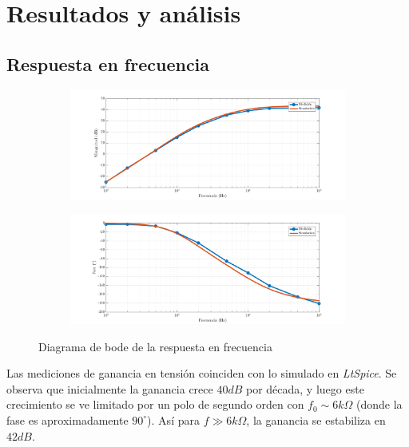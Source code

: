 \documentclass[../../e1_tp1_main.tex]{subfiles}
\begin{document}
\section{Resultados y an\'alisis}

\subsection{Respuesta en frecuencia}


\begin{figure} [H]
	\label{fig:2-hf}
	\centering
	\begin{subfigure}[c]{\textwidth}
		\centering
		\includegraphics[scale=0.65]{imagenes/e1_tp1_ej2_hf_mag.png}
	\end{subfigure}
	
	
	\begin{subfigure}[c]{\textwidth}
		\centering
		\includegraphics[scale=0.65]{imagenes/e1_tp1_ej2_hf_fase.png}
	\end{subfigure}
	
	\caption{Diagrama de bode de la respuesta en frecuencia}
\end{figure}

Las mediciones de ganancia en tensi\'on coinciden con lo simulado en \textit{LtSpice}. Se observa que inicialmente la ganancia crece $40dB$ por d\'ecada, y luego este crecimiento se ve limitado por un polo de segundo orden con $f_0 \sim 6k\Omega$ (donde la fase es aproximadamente $90^\circ$). As\'i para $f\gg 6k\Omega$, la ganancia se estabiliza en $42dB$. \par
\end{document}
